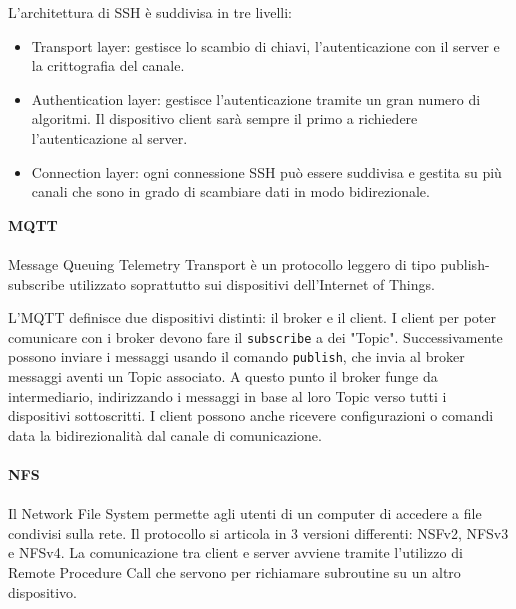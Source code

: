 \documentclass[12pt]{report}
\begin{document}
L'architettura di SSH è suddivisa in tre livelli:
\begin{itemize}
    \item Transport layer: gestisce lo scambio di chiavi, l'autenticazione con il server e la crittografia del canale.
    \item Authentication layer: gestisce l'autenticazione tramite un gran numero di algoritmi. Il dispositivo client sarà sempre il primo a richiedere l'autenticazione al server.
    \item Connection layer: ogni connessione SSH può essere suddivisa e gestita su più canali che sono in grado di scambiare dati in modo bidirezionale.
\end{itemize}

\noindent
\textbf{MQTT}
\\\\
Message Queuing Telemetry Transport è un protocollo leggero di tipo publish-subscribe utilizzato soprattutto sui dispositivi dell'Internet of Things. 

L'MQTT definisce due dispositivi distinti: il broker e il client. I client per poter comunicare con i broker devono fare il \lstinline{subscribe} a dei "Topic". Successivamente possono inviare i messaggi usando il comando \lstinline{publish}, che invia al broker messaggi aventi un Topic associato. A questo punto il broker funge da intermediario, indirizzando i messaggi in base al loro Topic verso tutti i dispositivi sottoscritti. I client possono anche ricevere configurazioni o comandi data la bidirezionalità dal canale di comunicazione.\cite{oasisMQTT}
\\\\
\textbf{NFS}
\\\\
Il Network File System permette agli utenti di un computer di accedere a file condivisi sulla rete. Il protocollo si articola in 3 versioni differenti: NSFv2, NFSv3 e NFSv4. La comunicazione tra client e server avviene tramite l'utilizzo di Remote Procedure Call che servono per richiamare subroutine su un altro dispositivo.\cite{rfcNFS}
\end{document}
